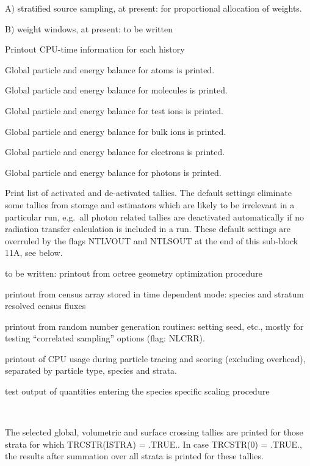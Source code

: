 \begin{description}
        A) stratified source sampling, at present:
        for proportional allocation of weights.

        B) weight windows, at present: to be written
  \item[TRCTIM] Printout CPU-time
        information for each history
  \item[TRCBLA] Global particle and energy balance
        for atoms is printed.
  \item[TRCBLM] Global particle and energy balance for molecules is printed.
  \item[TRCBLI] Global particle and energy balance for test ions is printed.
  \item[TRCBLP] Global particle and energy balance for bulk ions is printed.
  \item[TRCBLE] Global particle and energy balance for electrons is printed.
  \item[TRCBLPH] Global particle and energy balance for photons is printed.
  \item[TRCTAL] Print list of activated and de-activated tallies.
        The default settings eliminate some tallies from storage and estimators which
        are likely to be irrelevant in a particular run, e.g.\ all photon related
        tallies are deactivated automatically if no radiation transfer calculation is
        included in a run.
        These default settings are overruled by the flags NTLVOUT and NTLSOUT at the
        end of this sub-block 11A, see below.
  \item[TRCOCT] to be written: printout from octree geometry optimization
        procedure
  \item[TRCCEN] printout from census array stored in time dependent
        mode:
        species and stratum resolved census fluxes
  \item[TRCRNF] printout from random number generation routines: setting seed,
        etc., mostly for testing ``correlated sampling'' options (flag: NLCRR).
  \item[TRCHKTIM] printout of CPU usage during particle tracing and scoring
        (excluding overhead), separated by particle type, species and strata.
  \item[TRCSCL] test output of quantities entering the species specific
        scaling procedure
  \item[TRCSRC(ISTRA), ISTRA = 0, NSTRAI] ~

        The selected global, volumetric and surface crossing tallies are printed for
        those strata for which TRCSTR(ISTRA) = .TRUE..
        In case TRCSTR(0) = .TRUE., the results after summation over all strata is
        printed for these tallies.


\end{description}

